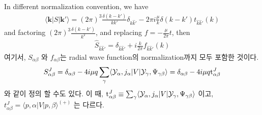 \documentclass[10pt]{book}
\def\bm{\boldsymbol}
\newcommand{\bea}{\begin{eqnarray}}
\newcommand{\eea}{\end{eqnarray}}
\def\vk{{\bm k}}
\def\la{\langle}
\def\ra{\rangle}
\begin{document}
\begin{itemize}
{In different normalization convention, we have
\bea
\la \vk|S|\vk'\ra
=(2\pi)^3\frac{\delta(k-k')}{k k'}\delta_{\hat{k}\hat{k}'}
-2\pi i\frac{\mu}{k}\delta(k-k') t_{\hat{k}\hat{k}'}(k) 
\eea
and factoring $(2\pi)^3\frac{\delta(k-k')}{k^2}$, 
and replacing $f=-\frac{\mu}{2\pi} t$, then
\bea
\hat{S}_{\hat{k}\hat{k}'}=\delta_{\hat{k}\hat{k}'}
                        +i\frac{k}{2\pi} f_{\hat{k}\hat{k}'}(k)
\eea
}
여기서, $S_{\alpha\beta}$ 와 $f_{\alpha\beta}$는 
radial wave function의 normalization까지 모두 포함한 것이다.
\bea
S^J_{\alpha\beta}=\delta_{\alpha\beta}-4i\mu q\sum_{\gamma}
\la {\cal Y}_\alpha, j_{\alpha}|V|{\cal Y}_{\gamma},\Psi_{\gamma\beta}\ra
=\delta_{\alpha\beta}-4i\mu q {\rm t}^J_{\alpha\beta}
\eea
와 같이 정의 할 수도 있다. 이 때, 
${\rm t}^J_{\alpha\beta}\equiv \sum_{\gamma}
\la {\cal Y}_\alpha, j_{\alpha}|V|{\cal Y}_{\gamma},\Psi_{\gamma\beta}\ra$ 이고,
$t^J_{\alpha\beta}=\la p,\alpha|V|p,\beta\ra^{(+)}$ 는 다르다.

\end{itemize}
\end{document}

